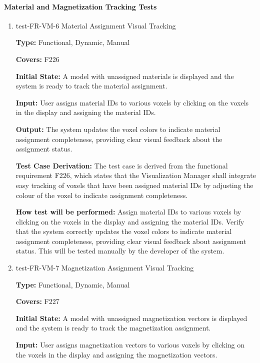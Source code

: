 \documentclass[12pt, titlepage]{article}
\begin{document}
\paragraph{Material and Magnetization Tracking Tests}

\begin{enumerate}

\item{test-FR-VM-6 Material Assignment Visual Tracking\\}
\label{sec:t-vm-6}

\textbf{Type:} Functional, Dynamic, Manual

\textbf{Covers:} F226
					
\textbf{Initial State:} A model with unassigned materials is displayed and the system is ready to track the material assignment.
					
\textbf{Input:} User assigns material IDs to various voxels by clicking on the voxels in the display and assigning the material IDs.
					
\textbf{Output:} The system updates the voxel colors to indicate material assignment completeness, providing clear visual feedback about the assignment status.

\textbf{Test Case Derivation:} The test case is derived from the functional requirement F226, which states that the Visualization Manager shall integrate easy tracking of voxels that have been assigned material IDs by adjusting the colour of the voxel to indicate assignment completeness.
					
\textbf{How test will be performed:} Assign material IDs to various voxels by clicking on the voxels in the display and assigning the material IDs. Verify that the system correctly updates the voxel colors to indicate material assignment completeness, providing clear visual feedback about assignment status. This will be tested manually by the developer of the system.

\item{test-FR-VM-7 Magnetization Assignment Visual Tracking\\}
\label{sec:t-vm-7}

\textbf{Type:} Functional, Dynamic, Manual

\textbf{Covers:} F227
					
\textbf{Initial State:} A model with unassigned magnetization vectors is displayed and the system is ready to track the magnetization assignment.
					
\textbf{Input:} User assigns magnetization vectors to various voxels by clicking on the voxels in the display and assigning the magnetization vectors.
					

\end{enumerate}
\end{document}
